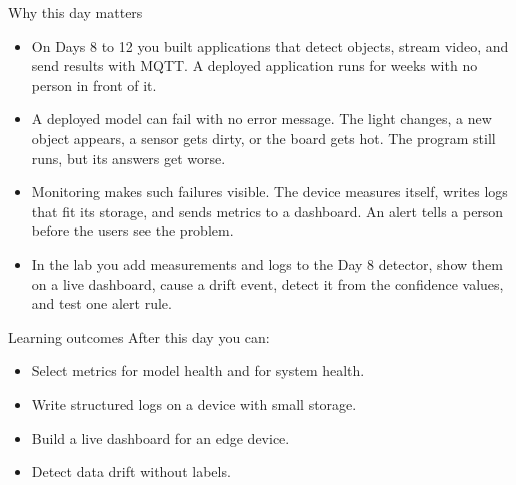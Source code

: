 \begin{frame}{Why this day matters}
  \begin{itemize}
    \item On Days 8 to 12 you built applications that detect objects, stream
          video, and send results with MQTT. A deployed application runs for
          weeks with no person in front of it.
    \item A deployed model can fail with no error message. The light changes,
          a new object appears, a sensor gets dirty, or the board gets hot.
          The program still runs, but its answers get worse.
    \item Monitoring makes such failures visible. The device measures itself,
          writes logs that fit its storage, and sends metrics to a dashboard.
          An alert tells a person before the users see the problem.
    \item In the lab you add measurements and logs to the Day 8 detector, show
          them on a live dashboard, cause a drift event, detect it from the
          confidence values, and test one alert rule.
  \end{itemize}
\end{frame}

\begin{frame}{Learning outcomes}
  After this day you can:
  \begin{itemize}
    \item Select metrics for model health and for system health.
    \item Write structured logs on a device with small storage.
    \item Build a live dashboard for an edge device.
    \item Detect data drift without labels.
  \end{itemize}
\end{frame}
